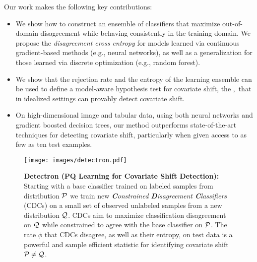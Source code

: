 Our work makes the following key contributions:

\begin{itemize}
    \item We show how to construct an ensemble of classifiers that maximize out-of-domain disagreement while behaving consistently in the training domain.
    We propose the \emph{disagreement cross entropy} for models learned via continuous gradient-based methods (e.g., neural networks), as well as a generalization for those learned via discrete optimization (e.g., random forest).
    \item We show that the rejection rate and the entropy of the learning ensemble can be used to define a model-aware hypothesis test for covariate shift, the \method,\ that in idealized settings can provably detect covariate shift.
    \item On high-dimensional image and tabular data, using both neural networks and gradient boosted decision trees, our method outperforms state-of-the-art techniques for detecting covariate shift, particularly when given access to as few as ten test examples.
\end{itemize}

\begin{figure}[!htb]
    \centering
    \texttt{[image: images/detectron.pdf]}
    \caption{\small \textbf{Detectron (PQ Learning for Covariate Shift Detection):} Starting with a base classifier trained on labeled samples from distribution $\mathcal{P}$ we
    train new \textit{\textbf{C}onstrained \textbf{D}isagreement \textbf{C}lassifiers} (CDCs) on a small set of observed unlabeled samples from a new distribution $\mathcal{Q}$.
    CDCs aim to maximize classification disagreement on $\mathcal{Q}$ while constrained to agree with the base classifier on $\mathcal{P}$. The rate $\phi$ that CDCs disagree,
        as well as their entropy, on test data is a powerful and sample efficient statistic for identifying covariate shift $\mathcal{P}\neq \mathcal{Q}$.}
    \label{fig:detectron}
\end{figure}